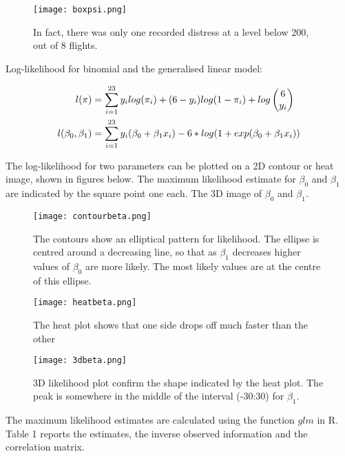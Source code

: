 \documentclass[12pt]{article}
\newcommand*\colvec[3][]{
    \begin{pmatrix}\ifx\relax#1\relax\else#1\\\fi#2\\#3\end{pmatrix}
}
\begin{document}
\begin{figure}[H]
    \centering
    \texttt{[image: boxpsi.png]}
    \label{fig:box.psi}
    \caption{In fact, there was only one recorded distress at a level below 200, out of 8 flights.}
\end{figure}

\item 
Log-likelihood for binomial and the generalised linear model:

\begin{align*}
l(\pi)&=\sum\limits_{i=1}^{23} y_i log(\pi_i) + (6-y_i)log(1-\pi_i) + log\colvec{6}{y_i}\\
l(\beta_0,\beta_1)&=\sum\limits_{i=1}^{23} y_i(\beta_0+\beta_1 x_i)-6*log(1+exp(\beta_0+\beta_1 x_i))
\end{align*}

\item 

The log-likelihood for two parameters can be plotted on a 2D contour or heat image, shown in figures below. The maximum likelihood estimate for $\beta_0$ and $\beta_1$ are indicated by the square point one each. The 3D image of $\beta_0$ and $\beta_1$. 

\begin{figure}[H]
    \centering
    \texttt{[image: contourbeta.png]}
    \caption{The contours show an elliptical pattern for likelihood. The ellipse is centred around a decreasing line, so that as $\beta_1$ decreases higher values of $\beta_0$ are more likely. The most likely values are at the centre of this ellipse.}
    \label{fig:box.psi}
\end{figure}

\begin{figure}[H]
    \centering
    \texttt{[image: heatbeta.png]}
    \label{fig:box.psi}
    \caption{The heat plot shows that one side drops off much faster than the other}

\end{figure}

\begin{figure}[H]
    \centering
    \texttt{[image: 3dbeta.png]}
    \label{fig:box.psi}
    \caption{3D likelihood plot confirm the shape indicated by the heat plot. The peak is somewhere in the middle  of the interval (-30:30) for $\beta_1$.}
\end{figure}

\item
The maximum likelihood estimates are calculated using the function $glm$ in R. Table 1 reports the estimates, the inverse observed information and the correlation matrix.
\end{document}
